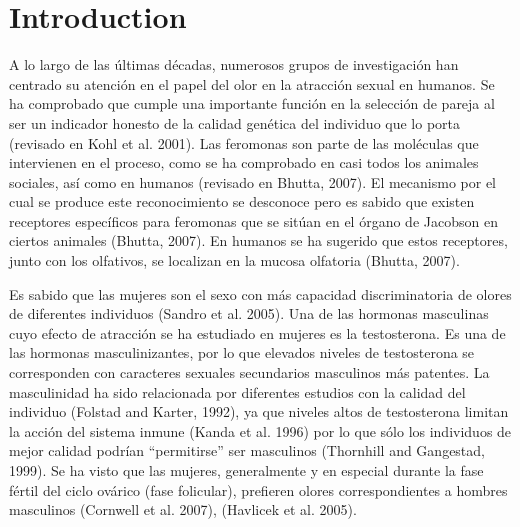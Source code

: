 \documentclass[fleqn,10pt]{SelfArx} %
\affiliation{\textsuperscript{1}\textit{Instituto de Parasitología y Biomedicina López-Neyra, CSIC, Granada, España}} %
\affiliation{\textsuperscript{2}\textit{Departmento de Etología, Universidad de Granada, España}} %
\affiliation{*\textbf{Corresponding author}: mariarl92@gmail.com} %
\begin{document}
\maketitle %

\tableofcontents %

\thispagestyle{empty} %


\section*{Introduction} %


A lo largo de las últimas décadas, numerosos grupos de investigación han centrado su atención en el papel del olor en la atracción sexual en humanos. Se ha comprobado que cumple una importante función en la selección de pareja al ser un indicador honesto de la calidad genética del individuo que lo porta (revisado en Kohl et al. 2001). Las feromonas son parte de las moléculas que intervienen en el proceso, como se ha comprobado en casi todos los animales sociales, así como en humanos (revisado en Bhutta, 2007). El mecanismo por el cual se produce este reconocimiento se desconoce pero es sabido que existen receptores específicos para feromonas que se sitúan en el órgano de Jacobson en ciertos animales (Bhutta, 2007). En humanos se ha sugerido que estos receptores, junto con los olfativos, se localizan en la mucosa olfatoria (Bhutta, 2007).

Es sabido que las mujeres son el sexo con más capacidad discriminatoria de olores de diferentes individuos (Sandro et al. 2005). Una de las hormonas masculinas cuyo efecto de atracción se ha estudiado en mujeres es la testosterona. Es una de las hormonas masculinizantes, por lo que elevados niveles de testosterona se corresponden con caracteres sexuales secundarios masculinos más patentes. La masculinidad ha sido relacionada por diferentes estudios con la calidad del individuo (Folstad and Karter, 1992), ya que niveles altos de testosterona limitan la acción del sistema inmune (Kanda et al. 1996) por lo que sólo los individuos de mejor calidad podrían “permitirse” ser masculinos (Thornhill and Gangestad, 1999). Se ha visto que las mujeres, generalmente y en especial durante la fase fértil del ciclo ovárico (fase folicular), prefieren olores correspondientes a hombres masculinos (Cornwell et al. 2007), (Havlicek et al. 2005).
\end{document}
